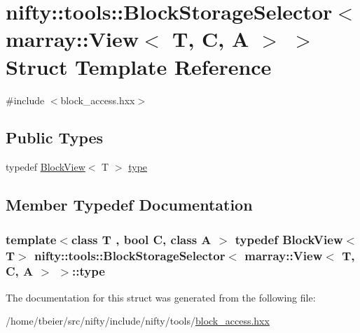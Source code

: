 \hypertarget{structnifty_1_1tools_1_1BlockStorageSelector_3_01marray_1_1View_3_01T_00_01C_00_01A_01_4_01_4}{}\section{nifty\+:\+:tools\+:\+:Block\+Storage\+Selector$<$ marray\+:\+:View$<$ T, C, A $>$ $>$ Struct Template Reference}
\label{structnifty_1_1tools_1_1BlockStorageSelector_3_01marray_1_1View_3_01T_00_01C_00_01A_01_4_01_4}


{\ttfamily \#include $<$block\+\_\+access.\+hxx$>$}

\subsection*{Public Types}
\begin{DoxyCompactItemize}
\item 
typedef \hyperlink{classnifty_1_1tools_1_1BlockView}{Block\+View}$<$ T $>$ \hyperlink{structnifty_1_1tools_1_1BlockStorageSelector_3_01marray_1_1View_3_01T_00_01C_00_01A_01_4_01_4_a23f0abbf6c69d9fd6db3d19d7de5c261}{type}
\end{DoxyCompactItemize}


\subsection{Member Typedef Documentation}
\hypertarget{structnifty_1_1tools_1_1BlockStorageSelector_3_01marray_1_1View_3_01T_00_01C_00_01A_01_4_01_4_a23f0abbf6c69d9fd6db3d19d7de5c261}{}
\subsubsection[{type}]{\setlength{\rightskip}{0pt plus 5cm}template$<$class T , bool C, class A $>$ typedef {\bf Block\+View}$<$T$>$ {\bf nifty\+::tools\+::\+Block\+Storage\+Selector}$<$ {\bf marray\+::\+View}$<$ T, C, A $>$ $>$\+::{\bf type}}\label{structnifty_1_1tools_1_1BlockStorageSelector_3_01marray_1_1View_3_01T_00_01C_00_01A_01_4_01_4_a23f0abbf6c69d9fd6db3d19d7de5c261}


The documentation for this struct was generated from the following file\+:\begin{DoxyCompactItemize}
\item 
/home/tbeier/src/nifty/include/nifty/tools/\hyperlink{block__access_8hxx}{block\+\_\+access.\+hxx}\end{DoxyCompactItemize}
